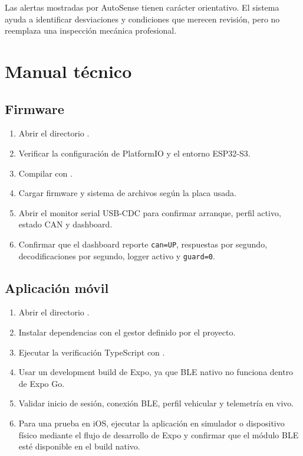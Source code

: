 \documentclass[12pt,letterpaper]{report}
\begin{document}
Las alertas mostradas por AutoSense tienen carácter orientativo. El sistema ayuda a identificar desviaciones y condiciones que merecen revisión, pero no reemplaza una inspección mecánica profesional.

\chapter{Manual técnico}

\section*{Firmware}

\begin{enumerate}
    \item Abrir el directorio .
    \item Verificar la configuración de PlatformIO y el entorno ESP32-S3.
    \item Compilar con .
    \item Cargar firmware y sistema de archivos según la placa usada.
    \item Abrir el monitor serial USB-CDC para confirmar arranque, perfil activo, estado CAN y dashboard.
    \item Confirmar que el dashboard reporte \texttt{can=UP}, respuestas por segundo, decodificaciones por segundo, logger activo y \texttt{guard=0}.
\end{enumerate}

\section*{Aplicación móvil}

\begin{enumerate}
    \item Abrir el directorio .
    \item Instalar dependencias con el gestor definido por el proyecto.
    \item Ejecutar la verificación TypeScript con .
    \item Usar un development build de Expo, ya que BLE nativo no funciona dentro de Expo Go.
    \item Validar inicio de sesión, conexión BLE, perfil vehicular y telemetría en vivo.
    \item Para una prueba en iOS, ejecutar la aplicación en simulador o dispositivo físico mediante el flujo de desarrollo de Expo y confirmar que el módulo BLE esté disponible en el build nativo.
\end{enumerate}
\end{document}
